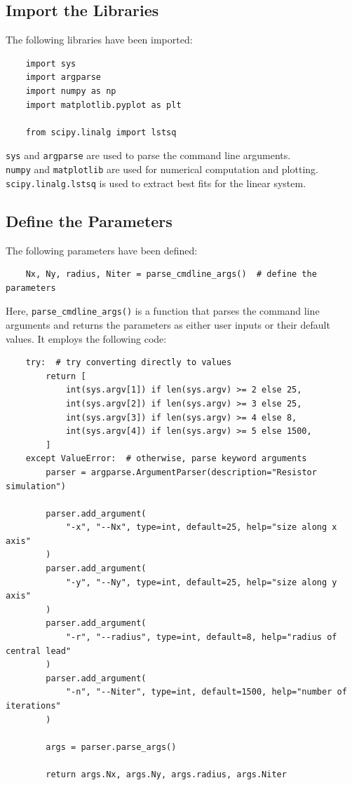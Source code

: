 \documentclass[12pt, a4paper]{article}
\newcommand{\code}{\lstinline[basicstyle=\small]}
\begin{document}
\subsection{Import the Libraries}
The following libraries have been imported:
\begin{lstlisting}
    import sys
    import argparse
    import numpy as np
    import matplotlib.pyplot as plt

    from scipy.linalg import lstsq
\end{lstlisting}
\code{sys} and \code{argparse} are used to parse the command line arguments. \\
\code{numpy} and \code{matplotlib} are used for numerical computation and plotting. \\
\code{scipy.linalg.lstsq} is used to extract best fits for the linear system.


\subsection{Define the Parameters}
The following parameters have been defined:
\begin{lstlisting}
    Nx, Ny, radius, Niter = parse_cmdline_args()  # define the parameters
\end{lstlisting}
Here, \code{parse_cmdline_args()} is a function that parses the command line arguments and returns
the parameters as either user inputs or their default values. It employs the following code:
\begin{lstlisting}
    try:  # try converting directly to values
        return [
            int(sys.argv[1]) if len(sys.argv) >= 2 else 25,
            int(sys.argv[2]) if len(sys.argv) >= 3 else 25,
            int(sys.argv[3]) if len(sys.argv) >= 4 else 8,
            int(sys.argv[4]) if len(sys.argv) >= 5 else 1500,
        ]
    except ValueError:  # otherwise, parse keyword arguments
        parser = argparse.ArgumentParser(description="Resistor simulation")

        parser.add_argument(
            "-x", "--Nx", type=int, default=25, help="size along x axis"
        )
        parser.add_argument(
            "-y", "--Ny", type=int, default=25, help="size along y axis"
        )
        parser.add_argument(
            "-r", "--radius", type=int, default=8, help="radius of central lead"
        )
        parser.add_argument(
            "-n", "--Niter", type=int, default=1500, help="number of iterations"
        )

        args = parser.parse_args()

        return args.Nx, args.Ny, args.radius, args.Niter

\end{lstlisting}
\pagebreak
\end{document}
